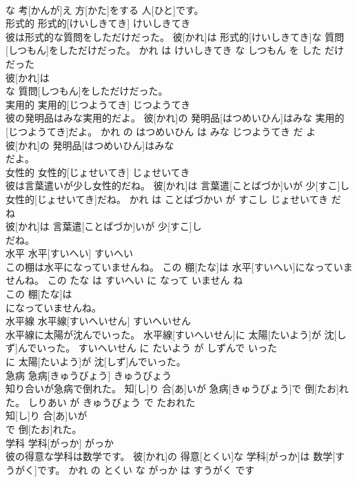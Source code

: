 \documentclass[8pt]{extreport}
\begin{document}
\begin{CJK}{UTF8}{min}
\\	な 考[かんが]え 方[かた]をする 人[ひと]です。			
\\	形式的	形式的[けいしきてき]	けいしきてき	
\\	彼は形式的な質問をしただけだった。	彼[かれ]は 形式的[けいしきてき]な 質問[しつもん]をしただけだった。	かれ は けいしきてき な しつもん を した だけ だった	
\\	彼[かれ]は
\\	な 質問[しつもん]をしただけだった。			
\\	実用的	実用的[じつようてき]	じつようてき	
\\	彼の発明品はみな実用的だよ。	彼[かれ]の 発明品[はつめいひん]はみな 実用的[じつようてき]だよ。	かれ の はつめいひん は みな じつようてき だ よ	
\\	彼[かれ]の 発明品[はつめいひん]はみな
\\	だよ。			
\\	女性的	女性的[じょせいてき]	じょせいてき	
\\	彼は言葉遣いが少し女性的だね。	彼[かれ]は 言葉遣[ことばづか]いが 少[すこ]し 女性的[じょせいてき]だね。	かれ は ことばづかい が すこし じょせいてき だ ね	
\\	彼[かれ]は 言葉遣[ことばづか]いが 少[すこ]し
\\	だね。			
\\	水平	水平[すいへい]	すいへい	
\\	この棚は水平になっていませんね。	この 棚[たな]は 水平[すいへい]になっていませんね。	この たな は すいへい に なって いません ね	
\\	この 棚[たな]は
\\	になっていませんね。			
\\	水平線	水平線[すいへいせん]	すいへいせん	
\\	水平線に太陽が沈んでいった。	水平線[すいへいせん]に 太陽[たいよう]が 沈[しず]んでいった。	すいへいせん に たいよう が しずんで いった	
\\	に 太陽[たいよう]が 沈[しず]んでいった。			
\\	急病	急病[きゅうびょう]	きゅうびょう	
\\	知り合いが急病で倒れた。	知[し]り 合[あ]いが 急病[きゅうびょう]で 倒[たお]れた。	しりあい が きゅうびょう で たおれた	
\\	知[し]り 合[あ]いが
\\	で 倒[たお]れた。			
\\	学科	学科[がっか]	がっか	
\\	彼の得意な学科は数学です。	彼[かれ]の 得意[とくい]な 学科[がっか]は 数学[すうがく]です。	かれ の とくい な がっか は すうがく です	

\end{CJK}
\end{document}
